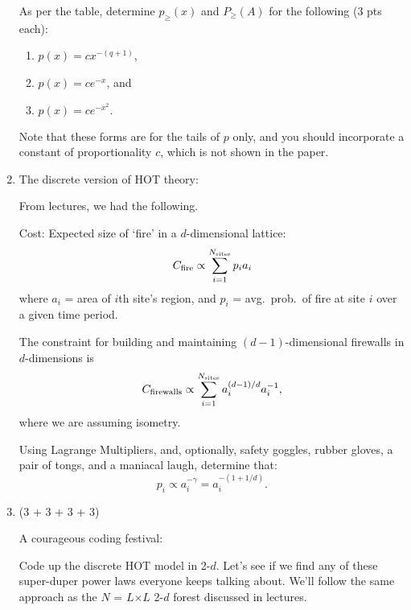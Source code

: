 \begin{enumerate}
  As per the table, determine
  $p_{\ge}(x)$
  and
  $P_{\ge}(A)$
  for the following (3 pts each):
  \begin{enumerate}
  \item
    $
    p(x) = c x^{-(q+1)}$,
  \item
    $
    p(x) = c e^{-x}$, and 
  \item
    $
    p(x) = c e^{-x^2}.
    $
  \end{enumerate}

  Note that these forms are for the tails of $p$ only,
  and you should incorporate a constant
  of proportionality $c$, which is not shown
  in the paper.

  
   \solutionstart


   \solutionend

    \item
      The discrete version of HOT theory:

      From lectures, we had the following.

      Cost: Expected size of `fire' in a $d$-dimensional lattice:
      $$
      C_{\rm fire}
      \propto \sum_{i=1}^{N_{\rm sites}} p_i a_i
      $$ 
      where 
      $a_i$ = area of $i$th site's region,
      and
      $p_i$ = avg.\ prob.\ of fire at site $i$ over a given time period.

      The constraint for building and maintaining 
      $(d-1)$-dimensional firewalls in $d$-dimensions is
      $$
      C_{\rm firewalls} 
      \propto 
      \sum_{i=1}^{N_{\rm sites}} a_i^{(d-1)/d} a_i^{-1},
      $$
      where we are assuming isometry.

      Using Lagrange Multipliers, and, optionally, safety goggles,
      rubber gloves, a pair of tongs, and a maniacal laugh,
      determine that:
      $$ 
      p_i 
      \propto 
      a_i^{-\gamma} 
      = 
      a_i^{-(1 + 1/d)}.
      $$


      
   \solutionstart


   \solutionend


\item (3 + 3 + 3 + 3)

  A courageous coding festival:

  Code up the discrete HOT model in 2-$d$.
  Let's see if we find any of these super-duper power laws
  everyone keeps talking about.  We'll follow the same
  approach as the $N$ = $L$$\times$$L$ 2-$d$ forest discussed in lectures.


\end{enumerate}
